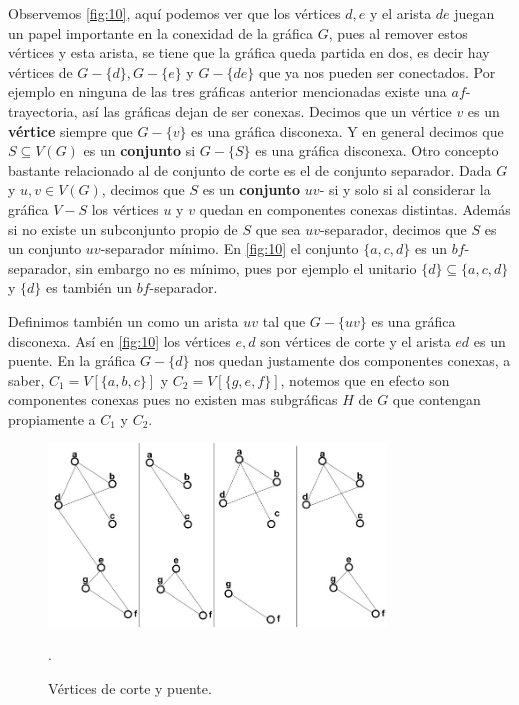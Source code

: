 Observemos \cref{fig:10}, aquí podemos ver que los vértices $d,e$ y el arista
$de$ juegan un papel importante en la conexidad de la gráfica $G$, pues al
remover estos vértices y esta arista, se tiene que la gráfica queda partida en
dos, es decir hay vértices de $G-\{d\}, G-\{e\}$ y $G-\{ de\}$ que ya nos pueden
ser conectados. Por ejemplo en ninguna de las tres gráficas anterior mencionadas
existe una $af$-trayectoria, así las gráficas dejan de ser conexas. Decimos que
un vértice $v$ es un \textbf{vértice}  siempre que
$G-\{v\}$ es una gráfica disconexa. Y en general decimos que $S\subseteq V(G)$
es un \textbf{conjunto} si $G-\{S\}$ es una
gráfica disconexa. Otro concepto bastante relacionado al de conjunto de corte es
el de conjunto separador. Dada $G$ y $u,v\in V(G)$, decimos que $S$ es un
\textbf{conjunto} $uv$- si y solo si al
considerar la gráfica $V-S$ los vértices $u$ y $v$ quedan en componentes conexas
distintas. Además si no existe un subconjunto propio de $S$ que sea
$uv$-separador, decimos que $S$ es un conjunto $uv$-separador mínimo. En
\cref{fig:10} el conjunto $\{a,c,d\}$ es un $bf$-separador, sin embargo no es
mínimo, pues por ejemplo el unitario $\{d \} \subseteq \{a,c,d\}$ y $\{d \}$ es
también un $bf$-separador. 

Definimos también un  como un arista $uv$ tal que $G-\{uv\}$ es
una gráfica disconexa. Así en \cref{fig:10} los vértices $e,d$ son vértices de
corte y el arista $ed$ es un puente. En la gráfica $G-\{ d\}$ nos quedan
justamente dos componentes conexas, a saber, $C_1=V[\{a,b,c \}]$ y
$C_2=V[\{g,e,f\}]$, notemos que en efecto son componentes conexas pues no
existen mas subgráficas $H$ de $G$ que contengan propiamente a $C_1$ y $C_2$. 

\begin{figure}[H]
  \centering
  \includegraphics[width=0.8\textwidth]{recursos/capturas/14.jpg}
  \caption{Vértices de corte y puente.}.
  \label{fig:09}
\end{figure}


